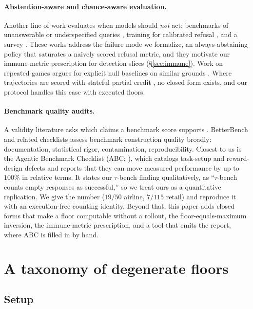 \documentclass{article}
\theoremstyle{plain}
\theoremstyle{definition}
\begin{document}
\paragraph{Abstention-aware and chance-aware evaluation.}
Another line of work evaluates when models should \emph{not} act: benchmarks of unanswerable or underspecified queries \citep{kirichenko2025abstentionbench,madhusudhan2026mmaqa}, training for calibrated refusal \citep{zhai2026abstainr1,gul2026mash}, and a survey \citep{wen2024abstention}. These works address the failure mode we formalize, an always-abstaining policy that saturates a naively scored refusal metric, and they motivate our immune-metric prescription for detection slices (\S\ref{sec:immune}). Work on repeated games argues for explicit null baselines on similar grounds \citep{papadopoulos2026coordination}. Where trajectories are scored with stateful partial credit \citep{lu2024toolsandbox,hallinan2026opaquetools}, no closed form exists, and our protocol handles this case with executed floors.

\paragraph{Benchmark quality audits.}
A validity literature asks which claims a benchmark score supports \citep{raji2021everything,bowman2021fix}. BetterBench \citep{reuel2024betterbench} and related checklists \citep{kapoor2024agents} assess benchmark construction quality broadly: documentation, statistical rigor, contamination, reproducibility. Closest to us is the Agentic Benchmark Checklist (ABC; \citealp{zhu2025abc}), which catalogs task-setup and reward-design defects and reports that they can move measured performance by up to $100\%$ in relative terms. It states our $\tau$-bench finding qualitatively, as ``$\tau$-bench counts empty responses as successful,'' so we treat ours as a quantitative replication. We give the number ($19/50$ airline, $7/115$ retail) and reproduce it with an execution-free counting identity. Beyond that, this paper adds closed forms that make a floor computable without a rollout, the floor-equals-maximum inversion, the immune-metric prescription, and a tool that emits the report, where ABC is filled in by hand.

\section{A taxonomy of degenerate floors}
\label{sec:taxonomy}

\subsection{Setup}
\end{document}
